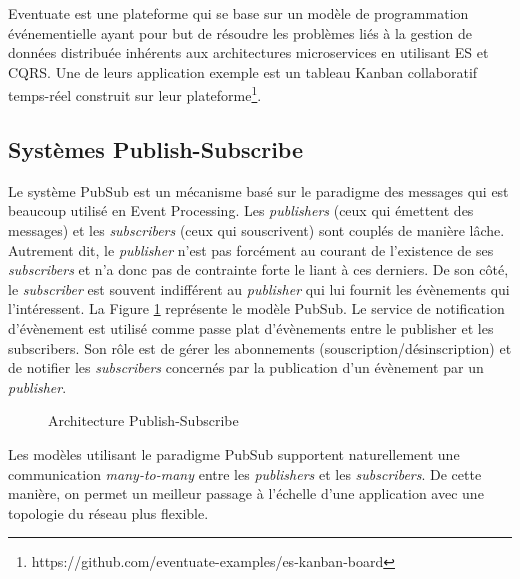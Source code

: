 Eventuate est une plateforme qui se base sur un modèle de programmation 
événementielle ayant pour but de résoudre les problèmes liés à la gestion de 
données distribuée inhérents aux architectures microservices en utilisant \gls{ES} et 
\gls{CQRS}. Une de leurs application exemple est un tableau Kanban collaboratif 
temps-réel construit sur leur 
plateforme\footnote{https://github.com/eventuate-examples/es-kanban-board}. 
	\subsection{Systèmes Publish-Subscribe}

Le système \gls{PubSub} est un mécanisme basé sur le 
paradigme des 
messages qui est beaucoup utilisé en Event Processing. 
Les \textit{publishers} (ceux qui émettent des messages) et les \textit{subscribers} 
(ceux qui souscrivent) sont couplés de manière lâche. 
Autrement dit, le \textit{publisher} n'est pas forcément au courant de l'existence de 
ses \textit{subscribers} et n'a donc pas de contrainte forte le liant à ces derniers. 
De son côté, le \textit{subscriber} est souvent indifférent au \textit{publisher} qui lui 
fournit les évènements qui l'intéressent. La Figure \ref{fig:pubsub} représente le 
modèle \gls{PubSub}.
Le service de notification d'évènement est utilisé comme passe plat d'évènements 
entre le publisher et les subscribers. Son rôle est de gérer les abonnements 
(souscription/désinscription) et de notifier les \textit{subscribers} concernés par la 
publication d'un évènement par un \textit{publisher}.

\begin{figure}[ht!]
	\centering
	\caption{Architecture Publish-Subscribe}
	\label{fig:pubsub}
\end{figure}


Les modèles utilisant le paradigme \gls{PubSub} supportent naturellement une 
communication \textit{many-to-many} 
entre les \textit{publishers} et les \textit{subscribers}.  De cette manière, on permet 
un meilleur passage à l'échelle d'une application avec une topologie du réseau plus 
flexible. 


